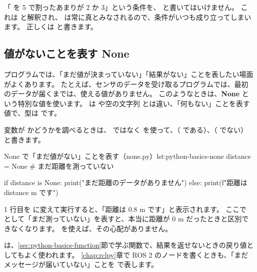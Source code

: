 \begin{caution}
  「 を 5 で割ったあまりが 2 か 3」という条件を、 と書いてはいけません。
  これは  と解釈され、 は常に真とみなされるので、条件がいつも成り立ってしまいます。
  正しくは  と書きます。
\end{caution}

\subsection{値がないことを表す None}
\label{sec:python-basics-none}

プログラムでは、「まだ値が決まっていない」「結果がない」ことを表したい場面がよくあります。
たとえば、センサのデータを受け取るプログラムでは、最初のデータが届くまでは、使える値がありません。
このようなときは、\textbf{None} という特別な値を使います。
 は  や空の文字列  とは違い、「何もない」ことを表す値で、型は  です。

変数が  かどうかを調べるときは、\cmd{==} ではなく  を使って、（ である）、（ でない）と書きます。

\begin{codelisting}[style=python]{None で「まだ値がない」ことを表す（none.py）}{lst:python-basics-none}
distance = None   # まだ距離を測っていない

if distance is None:
    print("まだ距離のデータがありません")
else:
    print(f"距離は {distance} m です")
\end{codelisting}


1 行目を  に変えて実行すると、「距離は 0.8 m です」と表示されます。
ここで  として「まだ測っていない」を表すと、本当に距離が 0 m だったときと区別できなくなります。
 を使えば、その心配がありません。

 は、\ref{sec:python-basics-function}節で学ぶ関数で、結果を返せないときの戻り値としてもよく使われます。
\ref{chap:rclpy}章で ROS 2 のノードを書くときも、「まだメッセージが届いていない」ことを  で表します。

